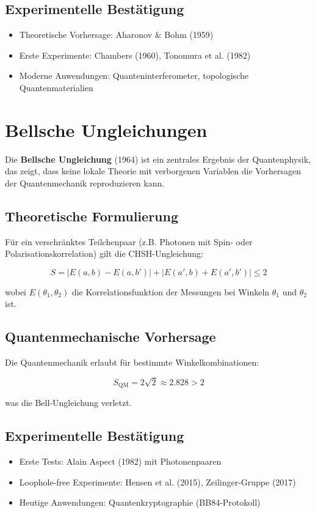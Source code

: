 \subsection{Experimentelle Bestätigung}
\begin{itemize}
\item Theoretische Vorhersage: Aharonov \& Bohm (1959)
\item Erste Experimente: Chambers (1960), Tonomura et al. (1982)
\item Moderne Anwendungen: Quanteninterferometer, topologische Quantenmaterialien
\end{itemize}

\section{Bellsche Ungleichungen}
\label{sec:bell}

Die \textbf{Bellsche Ungleichung} (1964) ist ein zentrales Ergebnis der Quantenphysik, das zeigt, dass keine lokale Theorie mit verborgenen Variablen die Vorhersagen der
Quantenmechanik reproduzieren kann.

\subsection{Theoretische Formulierung}
Für ein verschränktes Teilchenpaar (z.B. Photonen mit Spin- oder Polarisationskorrelation) gilt die CHSH-Ungleichung:

\begin{equation}
S = |E(a,b) - E(a,b')| + |E(a',b) + E(a',b')| \leq 2
\end{equation}

wobei $E(\theta_1, \theta_2)$ die Korrelationsfunktion der Messungen bei Winkeln $\theta_1$ und $\theta_2$ ist.

\subsection{Quantenmechanische Vorhersage}
Die Quantenmechanik erlaubt für bestimmte Winkelkombinationen:

\begin{equation}
S_{\text{QM}} = 2\sqrt{2} \approx 2.828 > 2
\end{equation}

was die Bell-Ungleichung verletzt.

\subsection{Experimentelle Bestätigung}
\begin{itemize}
\item Erste Tests: Alain Aspect (1982) mit Photonenpaaren
\item Loophole-free Experimente: Hensen et al. (2015), Zeilinger-Gruppe (2017)
\item Heutige Anwendungen: Quantenkryptographie (BB84-Protokoll)
\end{itemize}

